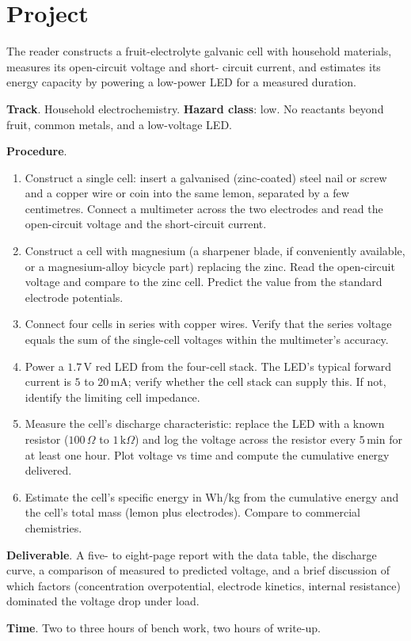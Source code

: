 \section{Project}

\begin{project}
The reader constructs a fruit-electrolyte galvanic cell with
household materials, measures its open-circuit voltage and short-
circuit current, and estimates its energy capacity by powering a
low-power LED for a measured duration.

\textbf{Track}. Household electrochemistry.
\textbf{Hazard class}: low. No reactants beyond fruit, common metals,
and a low-voltage LED.

\textbf{Procedure}.

\begin{enumerate}[leftmargin=*]
\item Construct a single cell: insert a galvanised (zinc-coated)
  steel nail or screw and a copper wire or coin into the same lemon,
  separated by a few centimetres. Connect a multimeter across the two
  electrodes and read the open-circuit voltage and the short-circuit
  current.
\item Construct a cell with magnesium (a sharpener blade, if
  conveniently available, or a magnesium-alloy bicycle part) replacing
  the zinc. Read the open-circuit voltage and compare to the zinc cell.
  Predict the value from the standard electrode potentials.
\item Connect four cells in series with copper wires. Verify that the
  series voltage equals the sum of the single-cell voltages within
  the multimeter's accuracy.
\item Power a $1.7\,\text{V}$ red LED from the four-cell stack. The
  LED's typical forward current is $5$ to $20\,\text{mA}$; verify
  whether the cell stack can supply this. If not, identify the
  limiting cell impedance.
\item Measure the cell's discharge characteristic: replace the LED
  with a known resistor ($100\,\Omega$ to $1\,\text{k}\Omega$) and
  log the voltage across the resistor every $5\,\text{min}$ for at
  least one hour. Plot voltage vs time and compute the cumulative
  energy delivered.
\item Estimate the cell's specific energy in Wh/kg from the
  cumulative energy and the cell's total mass (lemon plus electrodes).
  Compare to commercial chemistries.
\end{enumerate}

\textbf{Deliverable}. A five- to eight-page report with the data
table, the discharge curve, a comparison of measured to predicted
voltage, and a brief discussion of which factors (concentration
overpotential, electrode kinetics, internal resistance) dominated the
voltage drop under load.

\textbf{Time}. Two to three hours of bench work, two hours of
write-up.
\end{project}

